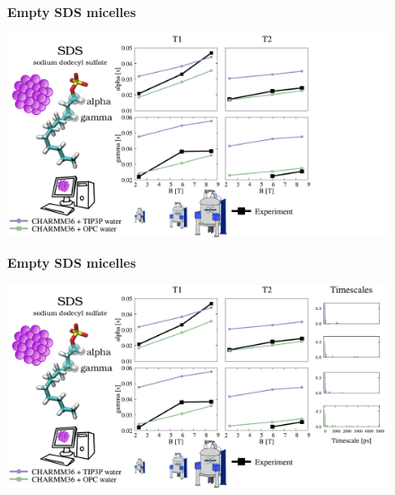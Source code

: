 \documentclass{beamer}
\begin{document}
\addtocounter{framenumber}{-1}
\begin{frame}
\begin{center}
\Large{\centering

\textbf{Empty SDS micelles} \\}

\vspace{0.5cm}


\includegraphics[height=6cm]{sds3.pdf}
\end{center}
\end{frame}


\addtocounter{framenumber}{-1}
\begin{frame}
\begin{center}
\Large{\centering

\textbf{Empty SDS micelles} \\}

\vspace{0.5cm}


\includegraphics[height=6cm]{sds2.pdf}
\end{center}
\end{frame}
\end{document}
